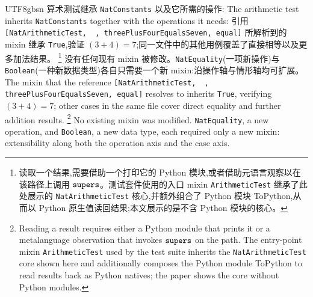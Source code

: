 \begin{CJK*}{UTF8}{gbsn}
\ifPaperChinese
  算术测试继承 \texttt{NatConstants} 以及它所需的操作:
  \else
  The arithmetic test inherits \texttt{NatConstants} together with the operations it needs:
  \fi
{}
\ifPaperChinese
引用 \texttt{[NatArithmeticTest, ~, threePlusFourEqualsSeven, equal]} 所解析到的 mixin 继承 \texttt{True},验证 $(3+4) = 7$;同一文件中的其他用例覆盖了直接相等以及更多加法结果。%
\footnote{
  读取一个结果,需要借助一个打印它的 Python 模块,或者借助元语言观察以在该路径上调用 $\mathtt{supers}$。测试套件使用的入口 mixin \texttt{ArithmeticTest} 继承了此处展示的 \texttt{NatArithmeticTest} 核心,并额外组合了 Python 模块 ToPython,从而以 Python 原生值读回结果;本文展示的是不含 Python 模块的核心。
}
没有任何现有 mixin 被修改。\texttt{NatEquality}(一项新操作)与 \texttt{Boolean}(一种新数据类型)各自只需要一个新 mixin:沿操作轴与情形轴均可扩展。
\else
The mixin that the reference \texttt{[NatArithmeticTest, ~, threePlusFourEqualsSeven, equal]} resolves to
inherits \texttt{True}, verifying $(3+4) = 7$; other cases in the same file
cover direct equality and further addition results.%
\footnote{
  Reading a result requires either a Python module that prints it or a
  metalanguage observation that invokes $\mathtt{supers}$ on the path.
  The entry-point mixin \texttt{ArithmeticTest} used by the test suite
  inherits the \texttt{NatArithmeticTest} core shown here and additionally
  composes the Python module ToPython to read results back as Python natives; the
  paper shows the core without Python modules.
}
No existing mixin was modified.
\texttt{NatEquality}, a new operation, and \texttt{Boolean},
a new data type, each required only a new mixin: extensibility along both
the operation axis and the case axis.
\fi


\end{CJK*}
